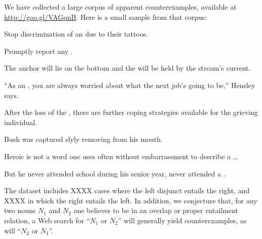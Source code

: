 \documentclass{article}
\begin{document}
We have collected a large corpus of apparent counterexamples,
available at \url{http://goo.gl/VAGqnB}. Here is a small sample from
that corpus:
%
\begin{examples}
\item\label{ourcorpus} 
  \begin{examples}
  \item Stop discrimination of an  due
    to their tattoos.
  \item Promptly report any .
  \item The anchor will lie on the bottom and the  will be held by the stream's current.
  \item ``As an , you are always worried
    about what the next job's going to be,'' Hensley says.
  \item After the loss of the , there are
    further coping strategies available for the grieving individual.
  \item Bush was captured slyly removing 
    from his mouth.
  \item Heroic is not a word one uses often without embarrassment to
    describe a  \ldots
  \item But he never attended school during his senior year, never
    attended a .
  \end{examples}
\end{examples}
%
The dataset includes XXXX cases where the left disjunct entails the
right, and XXXX in which the right entails the left.  In addition, we
conjecture that, for any two nouns $N_{1}$ and $N_{2}$ one believes to
be in an overlap or proper entailment relation, a Web search for
``$N_{1}$ or $N_{2}$'' will generally yield counterexamples, as will
``$N_{2}$ or $N_{1}$''. 

\end{document}
